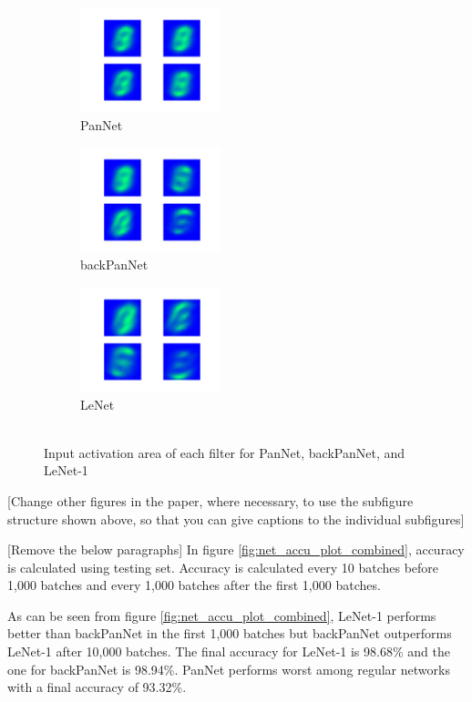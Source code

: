 \begin{figure}[t!]
    \centering
    \begin{subfigure}[t]{0.3\textwidth}
        \centering
        \includegraphics[height=1.2in]{Figures/PanNet}
        \caption{PanNet}
    \end{subfigure}
    \begin{subfigure}[t]{0.3\textwidth}
        \centering
        \includegraphics[height=1.2in]{Figures/backPanNet}
        \caption{backPanNet}
    \end{subfigure}%
    \begin{subfigure}[t]{0.3\textwidth}
        \centering
        \includegraphics[height=1.2in]{Figures/Lenet}
        \caption{LeNet}
    \end{subfigure}%
    \caption{\\Input activation area of each filter for PanNet,  backPanNet, and LeNet-1}
\end{figure}


[Change other figures in the paper, where necessary, to use the subfigure structure shown above, so that you can give captions to the individual subfigures]

[Remove the below paragraphs]
In figure \ref{fig:net_accu_plot_combined}, accuracy is calculated using testing set. Accuracy is calculated every 10 batches before 1,000 batches and every 1,000 batches after the first 1,000 batches. 

As can be seen from figure \ref{fig:net_accu_plot_combined}, LeNet-1 performs better than backPanNet in the first 1,000 batches but backPanNet outperforms LeNet-1 after 10,000 batches. The final accuracy for LeNet-1 is 98.68\% and the one for backPanNet is 98.94\%. PanNet performs worst among regular networks with a final accuracy of 93.32\%. 

